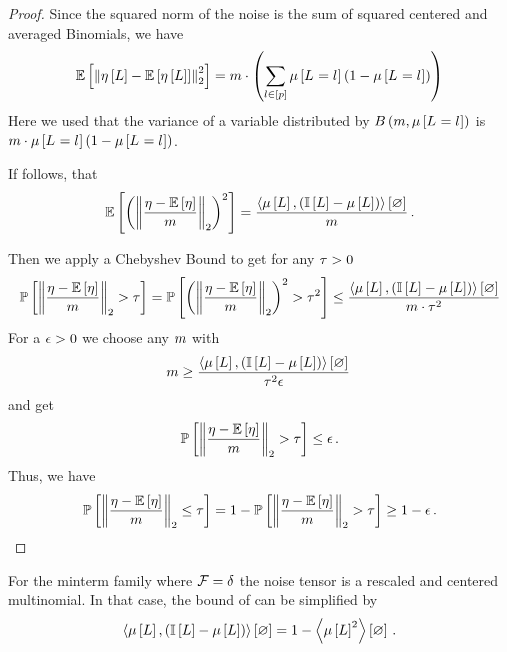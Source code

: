 \begin{proof}
    Since the squared norm of the noise is the sum of squared centered and averaged Binomials, we have
    \begin{align*}
        \mathbb{E}\left[\left\|\eta\left[L\right]-\mathbb{E}\left[\eta\left[L\right]\right]\right\|_{2}^2\right]
        = m \cdot \left(\sum_{l\in[p]} \mu\left[L_{}=l_{}\right](1-\mu\left[L_{}=l_{}\right])\right)
    \end{align*}
    Here we used that the variance of a variable distributed by $B\left(m,\mu\left[L_{}=l_{}\right]\right)$ is $m\cdot\mu\left[L_{}=l_{}\right](1-\mu\left[L_{}=l_{}\right])$.

    If follows, that
    \[ \mathbb{E}\left[\left(\left\|\frac{\eta-\mathbb{E}\left[\eta\right]}{m}\right\|_{2}\right)^2\right]
    = \frac{ \left\langle \mu\left[L\right],(\mathbb{I}\left[L\right]-\mu\left[L\right])\right\rangle \left[ \varnothing \right]}{m} \, . \]

    Then we apply a Chebyshev Bound to get for any $\tau>0$
    \begin{align}
        \mathbb{P}\left[\left\|\frac{\eta-\mathbb{E}\left[\eta\right]}{m}\right\|_{2} > \tau\right]
        = \mathbb{P}\left[\left(\left\|\frac{\eta-\mathbb{E}\left[\eta\right]}{m}\right\|_{2}\right)^2 > \tau^2\right]
        \leq \frac{ \left\langle \mu\left[L\right],(\mathbb{I}\left[L\right]-\mu\left[L\right])\right\rangle \left[ \varnothing \right]}{m \cdot \tau^2}
    \end{align}
    For a $\epsilon>0$ we choose any $m$ with
    \[ m \geq  \frac{ \left\langle \mu\left[L\right],(\mathbb{I}\left[L\right]-\mu\left[L\right])\right\rangle \left[ \varnothing \right]}{\tau^2 \epsilon} \, \]
    and get
    \begin{align}
        \mathbb{P}\left[\left\|\frac{\eta-\mathbb{E}\left[\eta\right]}{m}\right\|_{2} > \tau\right] \leq \epsilon \, .
    \end{align}
    Thus, we have
    \begin{align}
        \mathbb{P}\left[\left\|\frac{\eta-\mathbb{E}\left[\eta\right]}{m}\right\|_{2} \leq \tau\right]
        = 1 - \mathbb{P}\left[\left\|\frac{\eta-\mathbb{E}\left[\eta\right]}{m}\right\|_{2} > \tau\right]  \geq 1-\epsilon \, .
    \end{align}
\end{proof}


For the minterm family where $\mathcal{F} = \delta$ the noise tensor is a rescaled and centered multinomial.
In that case, the bound of  can be simplified by
\begin{align*}
    \left\langle \mu\left[L\right],(\mathbb{I}\left[L\right]-\mu\left[L\right])\right\rangle \left[ \varnothing \right] = 1- \left\langle \mu\left[L\right]^2\right\rangle \left[ \varnothing \right] \,.
\end{align*}


